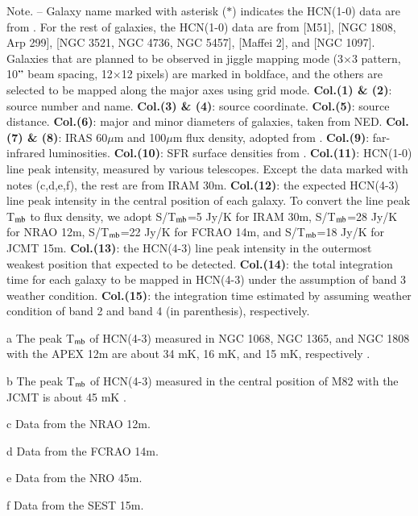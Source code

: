 \documentclass[legal,11pt]{article}
\begin{document}
\begin{table}
\begin{threeparttable}[b]
\begin{tablenotes}
Note. -- Galaxy name marked with asterisk ($\ast$) indicates the HCN(1-0) data
are from \citet{gs04a}. For the rest of galaxies, the HCN(1-0) data are from
\citet{Chen15} [M51], \citet{Baan08} [NGC 1808, Arp 299], \citet{usero15} [NGC 3521, NGC 4736, NGC
5457], \citet{Nguyen1992} [Maffei 2], and \citet{Kohno2003} [NGC 1097].
Galaxies that are planned to be observed in jiggle mapping mode (3$\times$3
pattern, 10$"$ beam spacing, 12$\times$12 pixels) are marked in boldface, and
the others are selected to be mapped along the major axes using grid mode.
% 
{\bf Col.(1) \& (2)}: source number and name. {\bf Col.(3) \& (4)}: source coordinate. 
% 
{\bf Col.(5)}: source distance. 
% 
{\bf Col.(6)}: major and minor
diameters of galaxies, taken from NED. 
% 
{\bf Col.(7) \& (8)}:  IRAS 60$\mu$m and 100$\mu$m flux density, adopted from \citet{smk03}. 
% 
{\bf Col.(9)}: far-infrared luminosities. 
% 
{\bf Col.(10)}: SFR surface densities from \cite{lgg2015}. 
% 
{\bf Col.(11)}: HCN(1-0)
line peak intensity, measured by various telescopes. Except the data marked with notes (c,d,e,f), the rest are from IRAM 30m. 
% 
{\bf Col.(12)}: the expected HCN(4-3) line peak intensity in the central position of each galaxy. To convert the line peak T$_{\rm mb}$ to flux density, we adopt S/T$_{\rm mb}$=5 Jy/K for IRAM 30m, S/T$_{\rm mb}$=28 Jy/K for NRAO 12m, S/T$_{\rm mb}$=22 Jy/K for FCRAO
14m, and S/T$_{\rm mb}$=18 Jy/K for JCMT 15m. 
% 
{\bf Col.(13)}: the HCN(4-3) line peak intensity in the outermost weakest position that expected to be detected.
% 
{\bf Col.(14)}: the total integration time for each galaxy to be mapped in HCN(4-3) under the assumption of band 3 weather condition.
% 
{\bf Col.(15)}: the integration time estimated 
by assuming weather condition of band 2 and band 4 (in parenthesis), respectively. \\

\item[a]{The peak T$_{\rm mb}$ of HCN(4-3) measured in NGC 1068, NGC 1365, and NGC 1808 with the APEX 12m are about 34 mK, 16 mK, and 15 mK, respectively \citep{zgh2014}.}
\item[b]{The peak T$_{\rm mb}$ of HCN(4-3) measured in the central position of M82 with the JCMT is about 45 mK \citep{Seaquist2000}.}
\item[c]{Data from the NRAO 12m.}
\item[d]{Data from the FCRAO 14m.}
\item[e]{Data from the NRO 45m.}
\item[f]{Data from the SEST 15m.}

\end{tablenotes}
\end{threeparttable}

\end{table}
\end{document}
